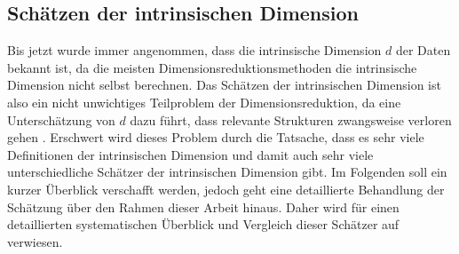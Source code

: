 
\subsection{Schätzen der intrinsischen Dimension}
\label{ch:Vergleich:sec:Methodik:subsec:SchaetzenDerIntrinsischenDim}

Bis jetzt wurde immer angenommen, dass die intrinsische Dimension $d$ der Daten bekannt ist, da die
meisten Dimensionsreduktionsmethoden die intrinsische Dimension nicht selbst berechnen. Das
Schätzen der intrinsischen Dimension ist also ein nicht unwichtiges Teilproblem der
Dimensionsreduktion, da eine Unterschätzung von $d$ dazu führt, dass relevante Strukturen
zwangsweise verloren gehen \parencite[1]{Levina.2004}. Erschwert wird dieses Problem durch die Tatsache, dass es sehr viele
Definitionen der intrinsischen Dimension und damit auch sehr viele unterschiedliche Schätzer der
intrinsischen Dimension gibt. Im Folgenden soll ein kurzer Überblick verschafft werden, jedoch geht
eine detaillierte Behandlung der Schätzung über den Rahmen dieser Arbeit hinaus. Daher wird für
einen detaillierten systematischen Überblick und Vergleich dieser Schätzer auf
\textcites{Campadelli.2015}{Bac.2021}{Verveer.1995} verwiesen.

